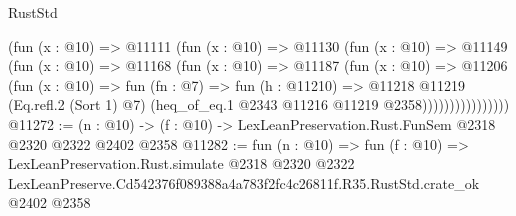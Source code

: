 \begin{lexlean}{RustStd}
\begin{coremodule}
                    (fun (x : @10) =>
                    @11111
                      (fun (x : @10) =>
                      @11130
                        (fun (x : @10) =>
                        @11149
                          (fun (x : @10) =>
                          @11168
                            (fun (x : @10) =>
                            @11187
                              (fun (x : @10) =>
                              @11206
                                (fun (x : @10) =>
                                fun (fn : @7) =>
                                fun (h : @11210) =>
                                @11218
                                  @11219
                                  (Eq.refl.{2} (Sort 1) @7)
                                  (heq_of_eq.{1} @2343 @11216 @11219 @2358))))))))))))))))
@11272 := (n : @10) -> (f : @10) -> LexLeanPreservation.Rust.FunSem @2318 @2320 @2322 @2402 @2358
@11282 := fun (n : @10) =>
  fun (f : @10) =>
  LexLeanPreservation.Rust.simulate
    @2318
    @2320
    @2322
    LexLeanPreserve.Cd542376f089388a4a783f2fc4c26811f.R35.RustStd.crate_ok
    @2402
    @2358
\end{coremodule}
\end{lexlean}
